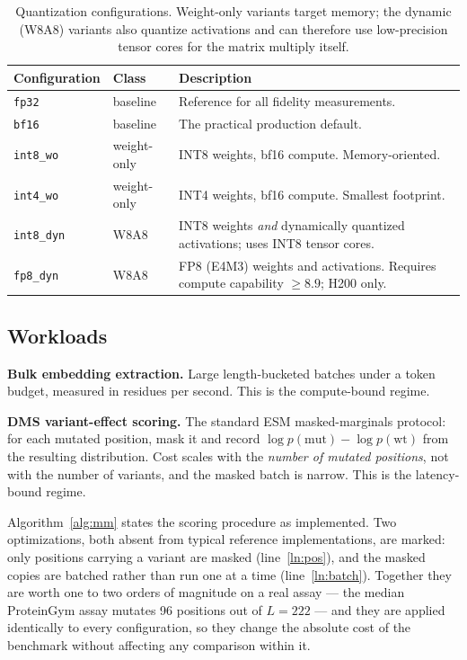 \documentclass[11pt]{article}
\newcommand{\cfg}[1]{\texttt{#1}}
\begin{document}
\begin{table}[htb]
\centering
\caption{Quantization configurations. Weight-only variants target memory; the
dynamic (W8A8) variants also quantize activations and can therefore use
low-precision tensor cores for the matrix multiply itself.}
\small
\begin{tabular}{llp{7.4cm}}
\toprule
Configuration & Class & Description \\
\midrule
\cfg{fp32}     & baseline    & Reference for all fidelity measurements. \\
\cfg{bf16}     & baseline    & The practical production default. \\
\cfg{int8\_wo} & weight-only & INT8 weights, bf16 compute. Memory-oriented. \\
\cfg{int4\_wo} & weight-only & INT4 weights, bf16 compute. Smallest footprint. \\
\cfg{int8\_dyn}& W8A8        & INT8 weights \emph{and} dynamically quantized
                               activations; uses INT8 tensor cores. \\
\cfg{fp8\_dyn} & W8A8        & FP8 (E4M3) weights and activations. Requires
                               compute capability $\geq 8.9$; H200 only. \\
\bottomrule
\end{tabular}
\end{table}

\subsection{Workloads}

\textbf{Bulk embedding extraction.} Large length-bucketed batches under a token
budget, measured in residues per second. This is the compute-bound regime.

\textbf{DMS variant-effect scoring.} The standard ESM masked-marginals protocol:
for each mutated position, mask it and record
$\log p(\text{mut}) - \log p(\text{wt})$ from the resulting distribution. Cost
scales with the \emph{number of mutated positions}, not with the number of
variants, and the masked batch is narrow. This is the latency-bound regime.

Algorithm~\ref{alg:mm} states the scoring procedure as implemented. Two
optimizations, both absent from typical reference implementations, are marked:
only positions carrying a variant are masked (line~\ref{ln:pos}), and the masked
copies are batched rather than run one at a time (line~\ref{ln:batch}). Together
they are worth one to two orders of magnitude on a real assay --- the median
ProteinGym assay mutates 96 positions out of $L=222$ --- and they are applied
identically to every configuration, so they change the absolute cost of the
benchmark without affecting any comparison within it.
\end{document}
